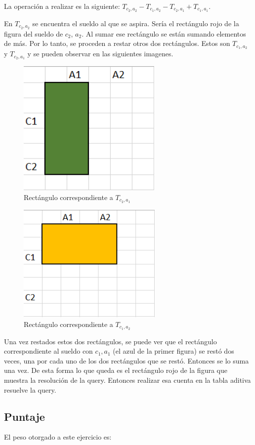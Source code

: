 La operación a realizar es la siguiente: $T_{c_2,a_2} - T_{c_1,a_2} - T_{c_2,a_1} + T_{c_1,a_1}$. 

En $T_{c_2,a_2}$ se encuentra el sueldo al que se aspira. Sería el rectángulo rojo de la figura del sueldo de $c_2$, $a_2$. Al sumar ese rectángulo se están sumando elementos de más. Por lo tanto, se proceden a restar otros dos rectángulos. Estos son  $T_{c_1,a_2}$ y $T_{c_2,a_1}$ y se pueden observar en las siguientes imagenes.

\begin{figure}[H]
\centering
\includegraphics[width=7cm]{Imagenes/Ej3d.png}
\caption{Rectángulo correspondiente a $T_{c_2,a_1}$}
\end{figure}

\begin{figure}[H]
\centering
\includegraphics[width=7cm]{Imagenes/Ej3e.png}
\caption{Rectángulo correspondiente a $T_{c_1,a_2}$}
\end{figure}

Una vez restados estos dos rectángulos, se puede ver que el rectángulo correspondiente al sueldo con $c_1,a_1$ (el azul de la primer figura) se restó dos veces, una por cada uno de los dos rectángulos que se restó. Entonces se lo suma una vez. De esta forma lo que queda es el rectángulo rojo de la figura que muestra la resolución de la query. Entonces realizar esa cuenta en la tabla aditiva resuelve la query.

\subsection{Puntaje}
El peso otorgado a este ejercicio es:
